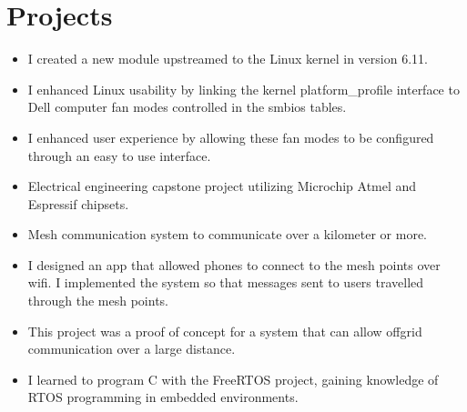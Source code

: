 \documentclass{lsanche_cv}
\begin{document}
\divider



\section{Projects}

		\begin{itemize}
			\item I created a new module upstreamed to the Linux kernel in version 6.11.
			\item I enhanced Linux usability by linking the kernel platform\_profile interface to Dell computer fan modes controlled in the smbios tables.
      \item I enhanced user experience by allowing these fan modes to be configured through an easy to use interface.
		\end{itemize}

	\divider

\begin{itemize}
\item Electrical engineering capstone project utilizing Microchip Atmel and Espressif chipsets.
\item Mesh communication system to communicate over a kilometer or more. 
\item I designed an app that allowed phones to connect to the mesh points over wifi. I implemented the system so that messages sent to users travelled through the mesh points.
\item This project was a proof of concept for a system that can allow offgrid communication over a large distance.
\item I learned to program C with the FreeRTOS project, gaining knowledge of RTOS programming in embedded environments.
\end{itemize}

\divider
\end{document}
